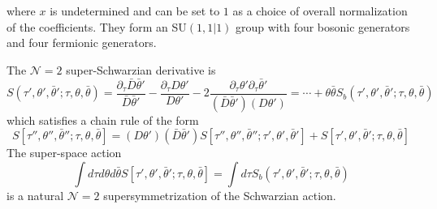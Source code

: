 \documentclass[aps,pre,preprint,onecolumn,citeautoscript,superscriptaddress,nofootinbib,eqsecnum]{revtex4-1}
\begin{document}
where $x$ is undetermined and can be set to $1$ as a choice of overall normalization of the coefficients. 
They form an SU$(1,1|1)$ group with four bosonic generators and four fermionic generators.

The $\mathcal{N}=2$ super-Schwarzian derivative is 
\begin{equation}
S(\tau', \theta', \bar \theta';\tau, \theta, \bar \theta) = \frac{\partial_\tau \bar D \bar \theta'}{\bar D \bar \theta'} 
- \frac{\partial_\tau D \theta'}{D \theta'} - 2 \frac{\partial_\tau \theta' \partial_\tau \bar \theta' }{(\bar D \bar \theta')(D \theta')} = \cdots + \theta \bar \theta S_b(\tau', \theta', \bar \theta';\tau, \theta, \bar \theta)
\end{equation}
which satisfies a chain rule of the form 
\begin{equation}
S[\tau'', \theta'',\bar \theta'';\tau, \theta, \bar \theta] = \left(D \theta' \right) \left(\bar D \bar \theta' \right)S[\tau'', \theta'', \bar \theta'';\tau', \theta', \bar \theta'] + S[\tau', \theta', \bar \theta';\tau, \theta, \bar \theta] 
\end{equation}
The super-space action 
\begin{equation}
\int d \tau d \theta d \bar \theta S[\tau', \theta', \bar \theta';\tau, \theta, \bar \theta] = \int d\tau S_b(\tau', \theta', \bar \theta';\tau, \theta, \bar \theta)
\end{equation}
is a natural $\mathcal{N}=2$ supersymmetrization of the Schwarzian action. 
\end{document}
